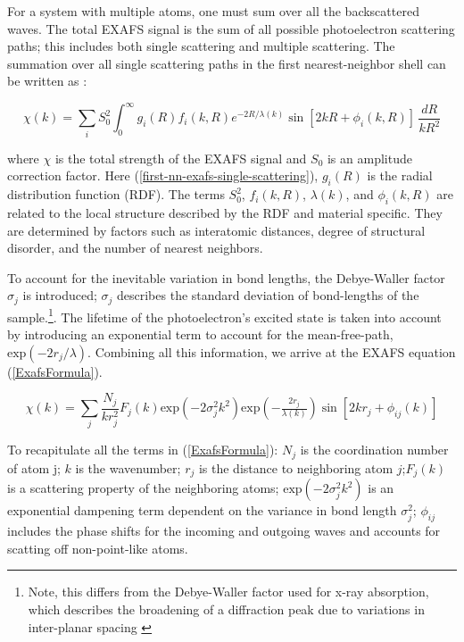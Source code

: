 For a system with multiple atoms, one must sum over all the backscattered waves. The total EXAFS signal is the sum of all possible photoelectron scattering paths; this includes both single scattering and multiple scattering. The summation over all single scattering paths in the first nearest-neighbor shell can be written as \cite{filipponi1995x} \cite{filipponi1995x2}:

\begin{equation}
    \label{first-nn-exafs-single-scattering}
    \chi(k) = \sum_i S_0^2 \int_{0}^{\infty} g_i(R) f_i(k, R) e^{-2R/\lambda(k)} \sin[2kR + \phi_i(k, R)]  \,\frac{dR}{kR^2} 
\end{equation}

\noindent where $ \chi $ is the total strength of the EXAFS signal and $ S_0$ is an amplitude correction factor. Here (\ref{first-nn-exafs-single-scattering}), $g_i(R)$ is the radial distribution function (RDF). The terms $ S_0^2 $, $ f_i (k, R) $, $\lambda(k)$, and $\phi_i(k, R)$ are related to the local structure described by the RDF and material specific. They are determined by factors such as interatomic distances, degree of structural disorder, and the number of nearest neighbors.

To account for the inevitable variation in bond lengths, the Debye-Waller factor $ \sigma_j $ is introduced; $ \sigma_j $ describes the standard deviation of bond-lengths of the sample.\footnote{Note, this differs from the Debye-Waller factor used for x-ray absorption, which describes the broadening of a diffraction peak due to variations in inter-planar spacing \cite{DW-diffraction}}. The lifetime of the photoelectron's excited state is taken into account by introducing an exponential term to account for the mean-free-path, $ \text{exp}({-2r_j/\lambda}) $. Combining all this information, we arrive at the EXAFS equation (\ref{ExafsFormula}). 

\begin{equation}
    \label{ExafsFormula}
    \chi(k) = \sum_j \frac{N_j}{kr_j^2}F_j(k)\text{exp}({-2\sigma_j^2k^2})\text{exp}({-\tfrac{2r_j}{\lambda(k)}})\sin[2kr_j + \phi_{ij}(k)]
\end{equation}

\noindent

To recapitulate all the terms in (\ref{ExafsFormula}): $ N_j  $ is the coordination number of atom j; $ k $  is the wavenumber; $ r_j $ is the distance to neighboring atom $ j $;$ F_j(k) $  is a scattering property of the neighboring atoms; $ \text{exp}({-2\sigma_j^2k^2}) $ is an exponential dampening term dependent on the variance in bond length $ \sigma_j^2 $; $ \phi_{ij} $ includes the phase shifts for the incoming and outgoing waves and  accounts for scatting off non-point-like atoms.    

